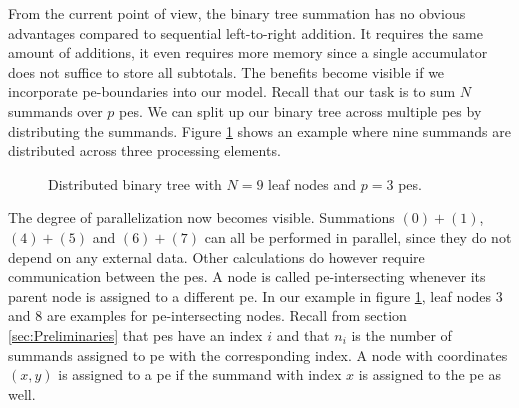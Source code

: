 From the current point of view, the binary tree summation has no obvious advantages compared to sequential left-to-right addition.
It requires the same amount of
additions, it even requires more memory since a single accumulator does not suffice to store all subtotals. The benefits become visible if we
incorporate \gls{pe}-boundaries into our model. Recall that our task is to sum $N$ summands over $p$ \glspl{pe}. We can split up our binary tree across
multiple \glspl{pe} by distributing the summands. Figure \ref{fig:distributed_binary_tree} shows an example where nine summands are distributed
across three processing elements.
\begin{figure}[H]
\centering
{}
\caption{Distributed binary tree with $N=9$ leaf nodes and $p=3$ \glspl{pe}.}
\label{fig:distributed_binary_tree}
\end{figure}
The degree of parallelization now becomes visible. Summations $(0) + (1)$, $(4) + (5)$ and $(6) + (7)$ can all be performed in parallel, since
they do not depend on any external data. Other calculations do however require communication between the \acrshort{pe}s. A node is called \acrshort{pe}-intersecting
whenever its parent node is assigned to a different \gls{pe}. In our example in figure \ref{fig:distributed_binary_tree}, leaf nodes $3$ and $8$ are examples
for \gls{pe}-intersecting nodes.
Recall from section \ref{sec:Preliminaries} that \gls{pe}s have an index $i$ and that $n_i$ is the number of summands assigned to \gls{pe} with the corresponding
index. A node with coordinates $(x, y)$ is assigned to a \gls{pe} if the summand with index $x$ is assigned to the \gls{pe} as well.
